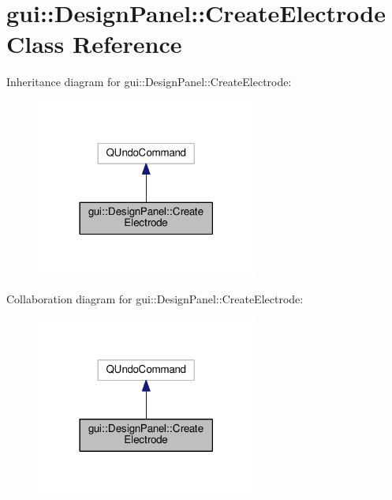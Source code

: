 \hypertarget{classgui_1_1DesignPanel_1_1CreateElectrode}{}\section{gui\+:\+:Design\+Panel\+:\+:Create\+Electrode Class Reference}
\label{classgui_1_1DesignPanel_1_1CreateElectrode}


Inheritance diagram for gui\+:\+:Design\+Panel\+:\+:Create\+Electrode\+:\nopagebreak
\begin{figure}[H]
\begin{center}
\leavevmode
\includegraphics[width=206pt]{classgui_1_1DesignPanel_1_1CreateElectrode__inherit__graph}
\end{center}
\end{figure}


Collaboration diagram for gui\+:\+:Design\+Panel\+:\+:Create\+Electrode\+:\nopagebreak
\begin{figure}[H]
\begin{center}
\leavevmode
\includegraphics[width=206pt]{classgui_1_1DesignPanel_1_1CreateElectrode__coll__graph}
\end{center}
\end{figure}
